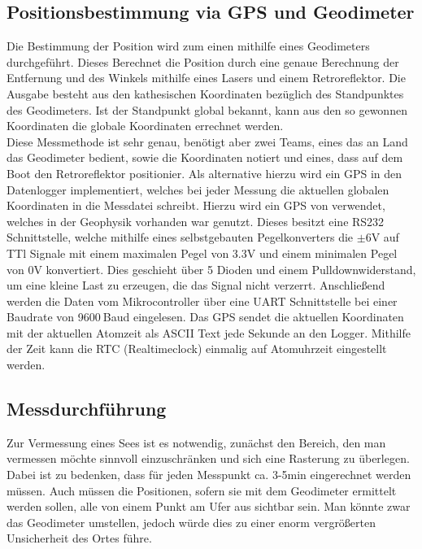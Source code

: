 \documentclass[12pt,a4paper,titlepage,headinclude,bibtotoc]{scrartcl}
\begin{document}
\subsection{Positionsbestimmung via GPS und Geodimeter}
Die Bestimmung der Position wird zum einen mithilfe eines Geodimeters durchgeführt.
Dieses Berechnet die Position durch eine genaue Berechnung der Entfernung und des Winkels mithilfe eines Lasers und einem Retroreflektor.
Die Ausgabe besteht aus den kathesischen Koordinaten bezüglich des Standpunktes des Geodimeters.
Ist der Standpunkt global bekannt, kann aus den so gewonnen Koordinaten die globale Koordinaten errechnet werden.\\
Diese Messmethode ist sehr genau, benötigt aber zwei Teams, eines das an Land das Geodimeter bedient, sowie die Koordinaten notiert und eines, dass auf dem Boot den Retroreflektor positionier.
Als alternative hierzu wird ein GPS in den Datenlogger implementiert, welches bei jeder Messung die aktuellen globalen Koordinaten in die Messdatei schreibt.
Hierzu wird ein GPS von %
verwendet, welches in der Geophysik vorhanden war genutzt.
Dieses besitzt eine RS232 Schnittstelle, welche mithilfe eines selbstgebauten Pegelkonverters die $\pm6\si{\volt}$ auf TTl Signale mit einem maximalen Pegel von 3.3\si{\volt} und einem minimalen Pegel von 0\si{\volt} konvertiert.
Dies geschieht über 5 Dioden und einem Pulldownwiderstand, um eine kleine Last zu erzeugen, die das Signal nicht verzerrt.
Anschließend werden die Daten vom Mikrocontroller über eine UART Schnittstelle bei einer Baudrate von 9600$~$Baud eingelesen.
Das GPS sendet die aktuellen Koordinaten mit der aktuellen Atomzeit als ASCII Text jede Sekunde an den Logger.
Mithilfe der Zeit kann die RTC (Realtimeclock) einmalig auf Atomuhrzeit eingestellt werden.

\subsection{Messdurchführung}

Zur Vermessung eines Sees ist es notwendig, zunächst den Bereich, den man vermessen möchte sinnvoll einzuschränken und sich eine Rasterung zu überlegen.
Dabei ist zu bedenken, dass für jeden Messpunkt ca. 3-5min eingerechnet werden müssen.
Auch müssen die Positionen, sofern sie mit dem Geodimeter ermittelt werden sollen, alle von einem Punkt am Ufer aus sichtbar sein.
Man könnte zwar das Geodimeter umstellen, jedoch würde dies zu einer enorm vergrößerten Unsicherheit des Ortes führe.
\end{document}
